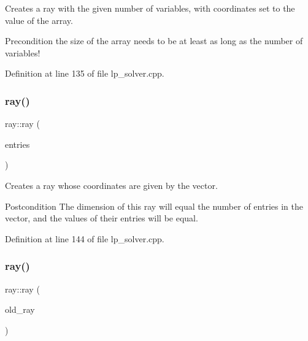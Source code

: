 Creates a ray with the given number of variables, with coordinates set to the value of the array. 

\begin{DoxyPrecond}{Precondition}
the size of the array needs to be at least as long as the number of variables! 
\end{DoxyPrecond}


Definition at line 135 of file lp\+\_\+solver.\+cpp.

\mbox{\label{classray_a6387c9c134132709f29770212648c718}} 
\subsubsection{\texorpdfstring{ray()}{ray()}\hspace{0.1cm}{\footnotesize\ttfamily [4/5]}}
{\footnotesize\ttfamily ray\+::ray (\begin{DoxyParamCaption}\item[{const vector$<$ R\+A\+Y\+E\+N\+T\+\_\+\+T\+Y\+PE $>$ \&}]{entries }\end{DoxyParamCaption})}



Creates a ray whose coordinates are given by the vector. 

\begin{DoxyPostcond}{Postcondition}
The dimension of this ray will equal the number of entries in the vector, and the values of their entries will be equal. 
\end{DoxyPostcond}


Definition at line 144 of file lp\+\_\+solver.\+cpp.

\mbox{\label{classray_af4ec5bf395f8b37cb7c4fd7f27999a5d}} 
\subsubsection{\texorpdfstring{ray()}{ray()}\hspace{0.1cm}{\footnotesize\ttfamily [5/5]}}
{\footnotesize\ttfamily ray\+::ray (\begin{DoxyParamCaption}\item[{const \hyperlink{classray}{ray} \&}]{old\+\_\+ray }\end{DoxyParamCaption})}



